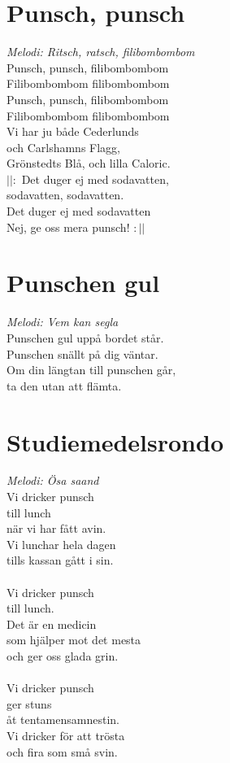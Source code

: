 \section{Punsch, punsch}
\textit{Melodi: Ritsch, ratsch, filibombombom}
\vspace{2mm}\\
Punsch, punsch, filibombombom\\
Filibombombom filibombombom\\
Punsch, punsch, filibombombom\\
Filibombombom filibombombom\\
Vi har ju både Cederlunds\\
och Carlshamns Flagg,\\
Grönstedts Blå, och lilla Caloric.\\
$||:$ Det duger ej med sodavatten,\\
sodavatten, sodavatten.\\
Det duger ej med sodavatten\\
Nej, ge oss mera punsch! $:||$\\

\section{Punschen gul}
\textit{Melodi: Vem kan segla}
\vspace{2mm}\\
Punschen gul uppå bordet står.\\
Punschen snällt på dig väntar.\\
Om din längtan till punschen går,\\
ta den utan att flämta.\\

\section{Studiemedelsrondo}
\textit{Melodi: Ösa saand}
\vspace{2mm}\\
Vi dricker punsch\\
till lunch\\
när vi har fått avin.\\
Vi lunchar hela dagen\\
tills kassan gått i sin.\\
\\
Vi dricker punsch\\
till lunch.\\
Det är en medicin\\
som hjälper mot det mesta\\
och ger oss glada grin.\\
\\
Vi dricker punsch\\
ger stuns\\
åt tentamensamnestin.\\
Vi dricker för att trösta\\
och fira som små svin.\\

